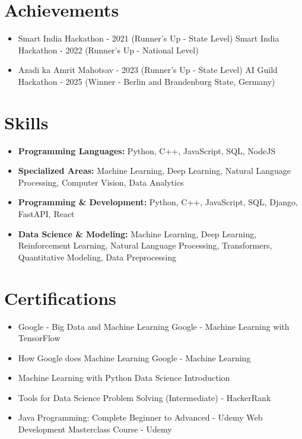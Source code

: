 \documentclass[a4paper,10pt]{article}
\begin{document}
\section*{Achievements}
\begin{itemize}
\item Smart India Hackathon - 2021 (Runner's Up - State Level) \hfill Smart India Hackathon - 2022 (Runner's Up - National Level)
\item Azadi ka Amrit Mahotsav - 2023 (Runner's Up - State Level) \hfill AI Guild Hackathon - 2025 (Winner - Berlin and Brandenburg State, Germany)
\end{itemize}

\section*{Skills}
\begin{itemize}
  \item \textbf{Programming Languages:} Python, C++, JavaScript, SQL, NodeJS
  \item \textbf{Specialized Areas:} Machine Learning, Deep Learning, Natural Language Processing, Computer Vision, Data Analytics
  \item \textbf{Programming \& Development:} Python, C++, JavaScript, SQL, Django, FastAPI, React
  \item \textbf{Data Science \& Modeling:} Machine Learning, Deep Learning, Reinforcement Learning, Natural Language Processing, Transformers, Quantitative Modeling, Data Preprocessing
\end{itemize}

\section*{Certifications}
\begin{itemize}
\item Google - Big Data and Machine Learning \hfill Google - Machine Learning with TensorFlow
\item How Google does Machine Learning \hfill Google - Machine Learning
\item Machine Learning with Python \hfill Data Science Introduction
\item Tools for Data Science \hfill Problem Solving (Intermediate) - HackerRank
\item Java Programming: Complete Beginner to Advanced - Udemy \hfill Web Development Masterclass Course - Udemy
\end{itemize}
\end{document}
